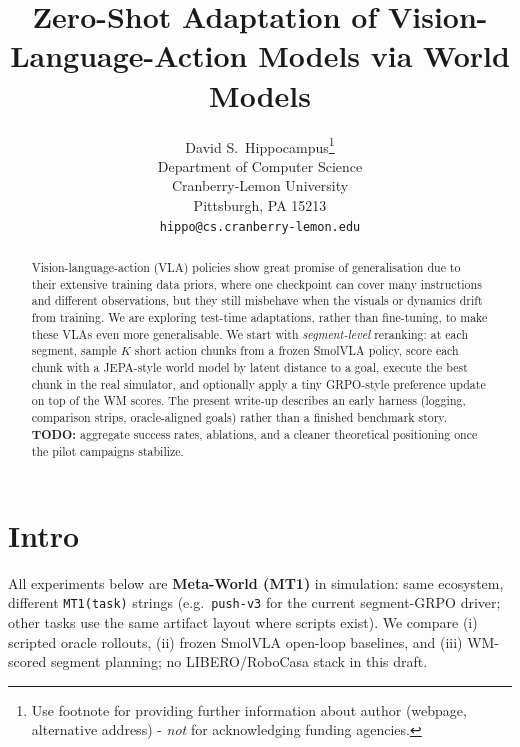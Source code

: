\documentclass{article}
\title{Zero-Shot Adaptation of Vision-Language-Action Models via World Models}
\author{%
  David S.~Hippocampus\thanks{Use footnote for providing further information
    about author (webpage, alternative address) - \emph{not} for acknowledging
    funding agencies.} \\
  Department of Computer Science\\
  Cranberry-Lemon University\\
  Pittsburgh, PA 15213 \\
  \texttt{hippo@cs.cranberry-lemon.edu} \\
}
\begin{document}
\maketitle


\begin{abstract}
Vision-language-action (VLA) policies show great promise of generalisation due to their extensive training data priors, where one checkpoint can cover many instructions and different observations, but they still misbehave when the visuals or dynamics drift from training. We are exploring test-time adaptations, rather than fine-tuning, to make these VLAs even more generalisable. We start with \emph{segment-level} reranking: at each segment, sample $K$ short action chunks from a frozen SmolVLA policy, score each chunk with a JEPA-style world model by latent distance to a goal, execute the best chunk in the real simulator, and optionally apply a tiny GRPO-style preference update on top of the WM scores. The present write-up describes an early harness (logging, comparison strips, oracle-aligned goals) rather than a finished benchmark story. \textbf{TODO:} aggregate success rates, ablations, and a cleaner theoretical positioning once the pilot campaigns stabilize.
\end{abstract}



\section{Intro}
All experiments below are \textbf{Meta-World (MT1)} in simulation: same ecosystem, different \texttt{MT1(task)} strings (e.g.\ \texttt{push-v3} for the current segment-GRPO driver; other tasks use the same artifact layout where scripts exist). We compare (i) scripted oracle rollouts, (ii) frozen SmolVLA open-loop baselines, and (iii) WM-scored segment planning; no LIBERO/RoboCasa stack in this draft.
\end{document}
